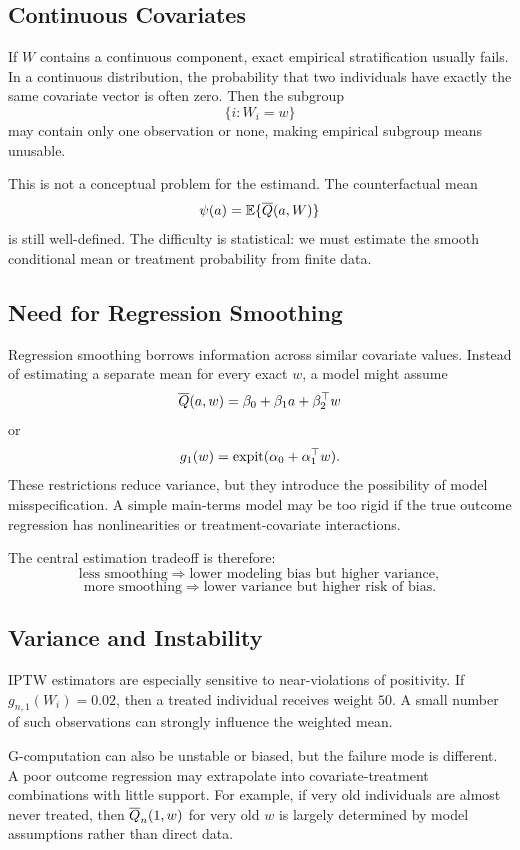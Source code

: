 \subsection{Continuous Covariates}

If $W$ contains a continuous component, exact empirical stratification usually fails.
In a continuous distribution, the probability that two individuals have exactly the
same covariate vector is often zero. Then the subgroup
\[
\{i:W_i=w\}
\]
may contain only one observation or none, making empirical subgroup means unusable.

This is not a conceptual problem for the estimand. The counterfactual mean
\[
\psi(a)=\mathbb{E}\{\overline{Q}(a,W)\}
\]
is still well-defined. The difficulty is statistical: we must estimate the smooth
conditional mean or treatment probability from finite data.

\subsection{Need for Regression Smoothing}

Regression smoothing borrows information across similar covariate values. Instead of
estimating a separate mean for every exact $w$, a model might assume
\[
\overline{Q}(a,w)=\beta_0+\beta_1a+\beta_2^\top w
\]
or
\[
g_1(w)=\operatorname{expit}(\alpha_0+\alpha_1^\top w).
\]
These restrictions reduce variance, but they introduce the possibility of model
misspecification. A simple main-terms model may be too rigid if the true outcome
regression has nonlinearities or treatment-covariate interactions.

The central estimation tradeoff is therefore:
\[
\text{less smoothing} \Rightarrow \text{lower modeling bias but higher variance},
\]
\[
\text{more smoothing} \Rightarrow \text{lower variance but higher risk of bias}.
\]

\subsection{Variance and Instability}

IPTW estimators are especially sensitive to near-violations of positivity. If
$g_{n,1}(W_i)=0.02$, then a treated individual receives weight $50$. A small number of
such observations can strongly influence the weighted mean.

G-computation can also be unstable or biased, but the failure mode is different. A
poor outcome regression may extrapolate into covariate-treatment combinations with
little support. For example, if very old individuals are almost never treated, then
$\overline{Q}_n(1,w)$ for very old $w$ is largely determined by model assumptions rather
than direct data.

